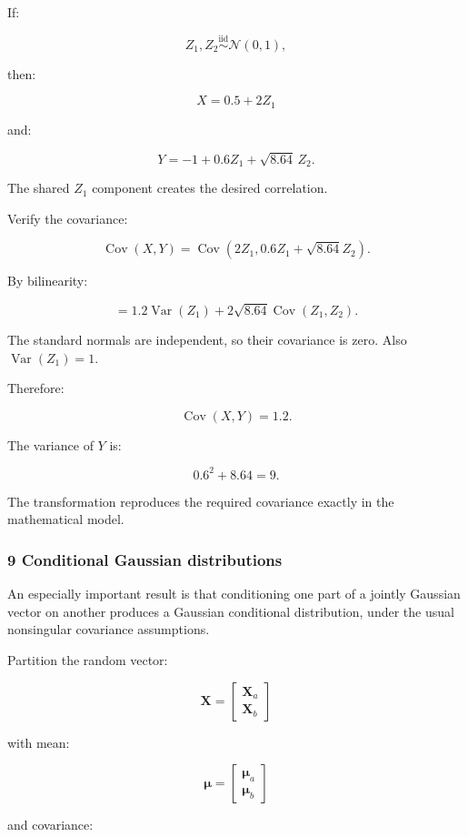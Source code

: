 If:

\[
 Z_1,Z_2\overset{\mathrm{iid}}{\sim}\mathcal N(0,1),
\]

then:

\[
 \boxed{ X=0.5+2Z_1 }
\]

and:

\[
 \boxed{ Y=-1+0.6Z_1+\sqrt{8.64}\,Z_2 }.
\]

The shared \(Z_1\) component creates the desired correlation.

Verify the covariance:

\[
 \operatorname{Cov}(X,Y) = \operatorname{Cov}(2Z_1,0.6Z_1+\sqrt{8.64}Z_2).
\]

By bilinearity:

\[
 = 1.2\operatorname{Var}(Z_1) + 2\sqrt{8.64}\operatorname{Cov}(Z_1,Z_2).
\]

The standard normals are independent, so their covariance is zero. Also \(\operatorname{Var}(Z_1)=1\).

Therefore:

\[
 \boxed{\operatorname{Cov}(X,Y)=1.2}.
\]

The variance of \(Y\) is:

\[
 0.6^2+8.64=9.
\]

The transformation reproduces the required covariance exactly in the mathematical model.

\subsubsection{9 Conditional Gaussian distributions}\label{02-foundations-ii-ch024-conditional-gaussian-distributions}

An especially important result is that conditioning one part of a jointly Gaussian vector on another produces a Gaussian conditional distribution, under the usual nonsingular covariance assumptions.

Partition the random vector:

\[
 \mathbf X= \begin{bmatrix} \mathbf X_a\\ \mathbf X_b \end{bmatrix}
\]

with mean:

\[
 \boldsymbol\mu= \begin{bmatrix} \boldsymbol\mu_a\\ \boldsymbol\mu_b \end{bmatrix}
\]

and covariance:

